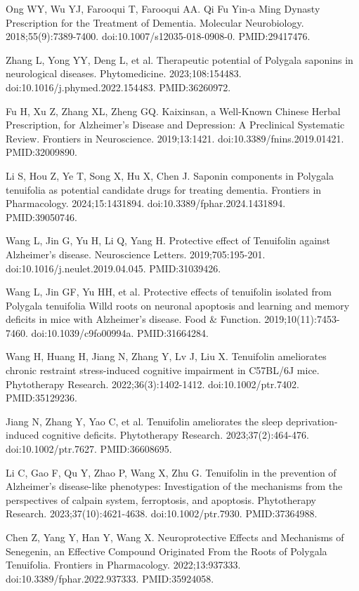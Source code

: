 \documentclass[12pt,oneside]{book}
\newcommand{\reff}[2]{\par\hangindent=7mm\hangafter=1\noindent[#1]\hspace{2mm}#2\par}
\begin{document}
\reff{3}{Ong WY, Wu YJ, Farooqui T, Farooqui AA. Qi Fu Yin-a Ming Dynasty Prescription for the Treatment of Dementia. Molecular Neurobiology. 2018;55(9):7389-7400. doi:10.1007/s12035-018-0908-0. PMID:29417476.}

\reff{4}{Zhang L, Yong YY, Deng L, et al. Therapeutic potential of Polygala saponins in neurological diseases. Phytomedicine. 2023;108:154483. doi:10.1016/j.phymed.2022.154483. PMID:36260972.}

\reff{5}{Fu H, Xu Z, Zhang XL, Zheng GQ. Kaixinsan, a Well-Known Chinese Herbal Prescription, for Alzheimer's Disease and Depression: A Preclinical Systematic Review. Frontiers in Neuroscience. 2019;13:1421. doi:10.3389/fnins.2019.01421. PMID:32009890.}

\reff{6}{Li S, Hou Z, Ye T, Song X, Hu X, Chen J. Saponin components in Polygala tenuifolia as potential candidate drugs for treating dementia. Frontiers in Pharmacology. 2024;15:1431894. doi:10.3389/fphar.2024.1431894. PMID:39050746.}

\reff{7}{Wang L, Jin G, Yu H, Li Q, Yang H. Protective effect of Tenuifolin against Alzheimer's disease. Neuroscience Letters. 2019;705:195-201. doi:10.1016/j.neulet.2019.04.045. PMID:31039426.}

\reff{8}{Wang L, Jin GF, Yu HH, et al. Protective effects of tenuifolin isolated from Polygala tenuifolia Willd roots on neuronal apoptosis and learning and memory deficits in mice with Alzheimer's disease. Food \& Function. 2019;10(11):7453-7460. doi:10.1039/c9fo00994a. PMID:31664284.}

\reff{9}{Wang H, Huang H, Jiang N, Zhang Y, Lv J, Liu X. Tenuifolin ameliorates chronic restraint stress-induced cognitive impairment in C57BL/6J mice. Phytotherapy Research. 2022;36(3):1402-1412. doi:10.1002/ptr.7402. PMID:35129236.}

\reff{10}{Jiang N, Zhang Y, Yao C, et al. Tenuifolin ameliorates the sleep deprivation-induced cognitive deficits. Phytotherapy Research. 2023;37(2):464-476. doi:10.1002/ptr.7627. PMID:36608695.}

\reff{11}{Li C, Gao F, Qu Y, Zhao P, Wang X, Zhu G. Tenuifolin in the prevention of Alzheimer's disease-like phenotypes: Investigation of the mechanisms from the perspectives of calpain system, ferroptosis, and apoptosis. Phytotherapy Research. 2023;37(10):4621-4638. doi:10.1002/ptr.7930. PMID:37364988.}

\reff{12}{Chen Z, Yang Y, Han Y, Wang X. Neuroprotective Effects and Mechanisms of Senegenin, an Effective Compound Originated From the Roots of Polygala Tenuifolia. Frontiers in Pharmacology. 2022;13:937333. doi:10.3389/fphar.2022.937333. PMID:35924058.}
\end{document}
